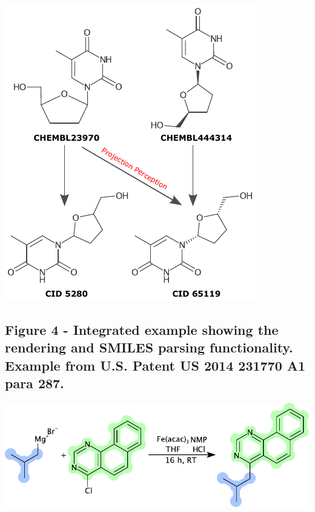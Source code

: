 \documentclass[10pt]{bmcart}
\begin{document}
\begin{backmatter}
\includegraphics{img/projections_annotated.pdf}

\subsection*{Figure 4 - Integrated example showing the rendering and SMILES
parsing functionality. Example from U.S. Patent \textbf{US 2014 231770 A1} para 287.}\label{fig:depiction}


\includegraphics[width=\textwidth]{img/US20140231770A1_0287.pdf}


\end{backmatter}
\end{document}
